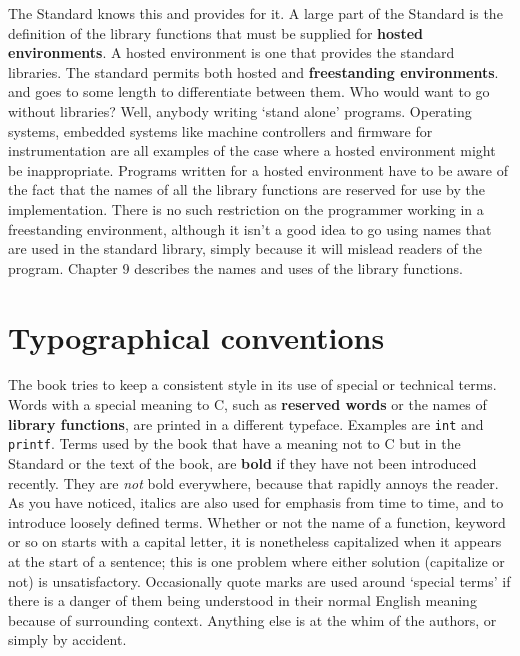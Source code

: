   The Standard knows this and provides for it. A large part of the Standard
   is the definition of the library functions that must be supplied for
   \textbf{hosted environments}. A hosted environment is one that provides
   the standard libraries. The standard permits both hosted and
   \textbf{freestanding environments}. and goes to some length to
   differentiate between them. Who would want to go without libraries? Well,
   anybody writing `stand alone' programs. Operating systems, embedded
   systems like machine controllers and firmware for instrumentation are all
   examples of the case where a hosted environment might be inappropriate.
   Programs written for a hosted environment have to be aware of the fact that
   the names of all the library functions are reserved for use by the
   implementation. There is no such restriction on the programmer working in a
   freestanding environment, although it isn't a good idea to go using names
   that are used in the standard library, simply because it will mislead
   readers of the program. Chapter 9 describes the names and uses
   of the library functions.


 
        \section*{Typographical conventions}
        

  

  The book tries to keep a consistent style in its use of special or
   technical terms. Words with a special meaning to C, such as
   \textbf{reserved words} or the names of \textbf{library functions}, are
   printed in a different typeface. Examples are \texttt{int} and
   \texttt{printf}. Terms used by the book that have a meaning not to C
   but in the Standard or the text of the book, are \textbf{bold} if they
   have not been introduced recently. They are \textit{not} bold everywhere,
   because that rapidly annoys the reader. As you have noticed, italics are
   also used for emphasis from time to time, and to introduce loosely defined
   terms. Whether or not the name of a function, keyword or so on starts with
   a capital letter, it is nonetheless capitalized when it appears at the
   start of a sentence; this is one problem where either solution (capitalize
   or not) is unsatisfactory. Occasionally quote marks are used around
   `special terms' if there is a danger of them being understood in
   their normal English meaning because of surrounding context. Anything else
   is at the whim of the authors, or simply by accident.


